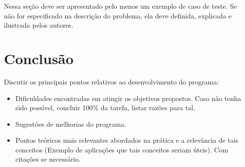 

Nessa seção deve ser apresentado pelo menos um exemplo de caso de teste. Se não for especificado na descrição do problema, ela deve definida, explicada e ilustrada pelos autores.

\section{Conclusão}\label{conclusion}

Discutir os principais pontos relativos ao desenvolvimento do programa:

\begin{itemize}
	\item Dificuldades encontradas em atingir os objetivos propostos. Caso não tenha sido possível, concluir 100\% da tarefa, listar razões para tal.
	\item Sugestões de melhorias do programa.
	\item Pontos teóricos mais relevantes abordados na prática e a relevância de tais conceitos (Exemplo de aplicações que tais conceitos seriam úteis). Com citações  se necessário.
\end{itemize}


